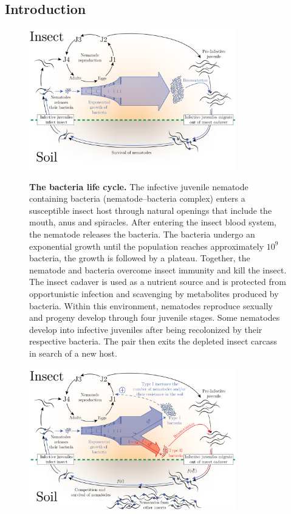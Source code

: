 \documentclass[10pt]{article}
\begin{document}
\begin{multicols}{2}
\section*{Introduction}
\begin{figure}[hbt!]
	  \centering
       \includegraphics[width=0.8\textwidth]{Figures/life_cycle.png}\\
		\caption{ \textbf{ The bacteria life cycle.} \label{fig:life_cycle}
		The infective juvenile nematode containing bacteria (nematode–bacteria complex) enters a susceptible insect host through natural openings that include the mouth, anus and spiracles.
		After entering the insect blood system, the nematode releases the bacteria.
		The bacteria undergo an exponential growth until the population reaches approximately $10^9$ bacteria, the growth is followed by a plateau.
		Together, the nematode and bacteria overcome insect immunity and kill the insect.
		The insect cadaver is used as a nutrient source and is protected from opportunistic infection and scavenging by metabolites produced by bacteria.
		Within this environment, nematodes reproduce sexually and progeny develop through four juvenile stages.
		Some nematodes develop into infective juveniles after being recolonized by their respective bacteria.
		The pair then exits the depleted insect carcass in search of a new host.}
\end{figure}
\begin{figure}[hbt!]
	  \centering
	  \label{fig:fitness}
       \includegraphics[width=0.8\textwidth]{Figures/fitness.png}\\

\end{figure}
\end{multicols}
\end{document}
